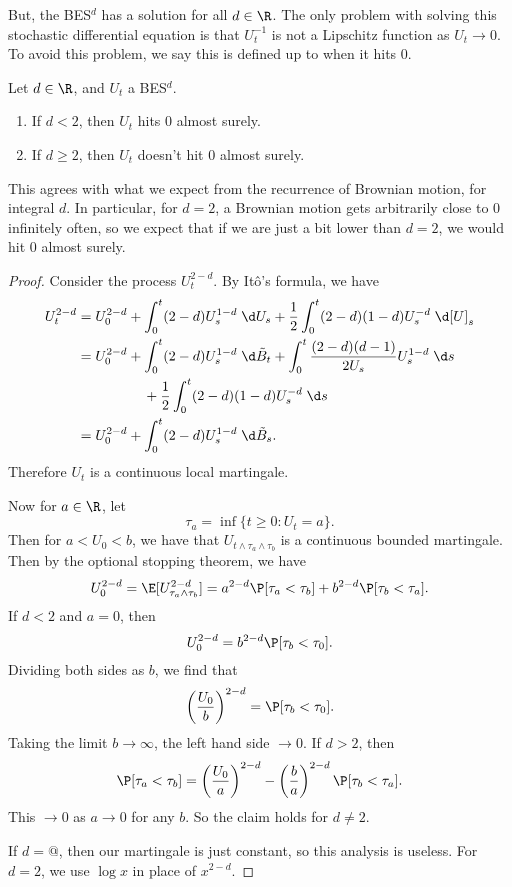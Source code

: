 \documentclass[a4paper]{article}
\begin{document}
But, the BES$^d$ has a solution for all $d \in \R$. The only problem with solving this stochastic differential equation is that $U_t^{-1}$ is not a Lipschitz function as $U_t \to 0$. To avoid this problem, we say this is defined up to when it hits $0$.

\begin{prop}
  Let $d \in \R$, and $U_t$ a BES$^d$.
  \begin{enumerate}
    \item If $d < 2$, then $U_t$ hits $0$ almost surely.
    \item If $d \geq 2$, then $U_t$ doesn't hit $0$ almost surely.
  \end{enumerate}
\end{prop}
This agrees with what we expect from the recurrence of Brownian motion, for integral $d$. In particular, for $d = 2$, a Brownian motion gets arbitrarily close to $0$ infinitely often, so we expect that if we are just a bit lower than $d = 2$, we would hit $0$ almost surely.
\begin{proof}
  Consider the process $U_t^{2 - d}$. By It\^o's formula, we have
  \begin{align*}
    U_t^{2 - d} &= U_0^{2 - d} + \int_0^t (2 - d) U_s^{1 - d} \;\d U_s + \frac{1}{2} \int_0^t (2 - d) (1 - d) U_s^{-d} \;\d [U]_s\\
    &= U_0^{2 - d} + \int_0^t (2 - d) U_s^{1 - d} \;\d \tilde{B}_t + \int_0^t \frac{(2 - d)(d - 1)}{2 U_s} U_s^{1 - d}\;\d s \\
    &\hphantom{aaaaaaaaa}+ \frac{1}{2} \int_0^t (2 - d)(1 - d) U_s^{-d}\;\d s\\
    &= U_0^{2 - d} + \int_0^t (2 - d) U_s^{1 - d}\;\d \tilde{B}_s.
  \end{align*}
  Therefore $U_t$ is a continuous local martingale.

  Now for $a \in \R$, let
  \[
    \tau_a = \inf \{t \geq 0 : U_t = a\}.
  \]
  Then for $a < U_0 < b$, we have that $U_{t \wedge \tau_a \wedge \tau_b}$ is a continuous bounded martingale. Then by the optional stopping theorem, we have
  \[
    U_0^{2 - d} = \E [U_{\tau_a \wedge \tau_b}^{2 - d}] = a^{2 - d} \P[\tau_a < \tau_b] + b^{2 - d} \P[\tau_b < \tau_a].
  \]
  If $d < 2$ and $a = 0$, then
  \[
    U_0^{2 - d} = b^{2 - d} \P[\tau_b < \tau_0].
  \]
  Dividing both sides as $b$, we find that
  \[
    \left(\frac{U_0}{b}\right)^{2 -d } = \P[\tau_b < \tau_0].
  \]
  Taking the limit $b \to \infty$, the left hand side $\to 0$. If $d > 2$, then
  \[
    \P[\tau_a < \tau_b] = \left(\frac{U_0}{a}\right)^{2 - d} - \left(\frac{b}{a}\right)^{2 - d} \P[\tau_b < \tau_a].
  \]
  This $\to 0$ as $a \to 0$ for any $b$. So the claim holds for $d \not= 2$.

  If $d = @$, then our martingale is just constant, so this analysis is useless. For $d = 2$, we use $\log x$ in place of $x^{2 - d}$.
\end{proof}
\end{document}
